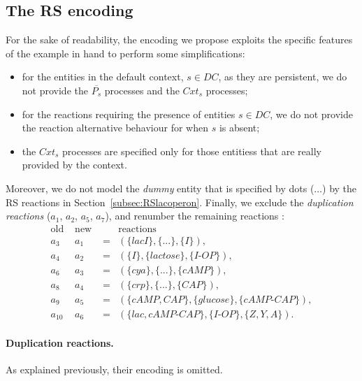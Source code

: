 \subsection{The RS encoding}
For the sake of readability, the encoding we propose exploits the specific features of the example in hand 
to perform some simplifications:
\begin{itemize}
\item for the entities in the default context, $s \in DC$, as they are persistent, we do not provide the $\overline{P_s}$ processes and the $Cxt_s$ processes;
\item for the reactions requiring the presence of entities $s \in DC$, we do not provide the reaction alternative behaviour for when $s$ is absent;
\item the $Cxt_s$ processes are specified only for those entitiess that are really provided by the context.
\end{itemize}
Moreover, we do not model the \emph{dummy} entity that is specified by  dots ($\dots$) by the RS reactions in Section~\ref{subsec:RSlacoperon}.
Finally, we exclude the \emph{duplication reactions} ($a_1$, $a_2$, $a_5$, $a_7$), and renumber the remaining reactions :
{\small
\[
\begin{array}{cccl}
\textrm{old } &\textrm{new }&& \textrm{reactions}\\
a_3 &a_1&=&(\{lacI\},\{. . .\},\{I\}),\\
a_4 &a_2&=&(\{I\},\{lactose\},\{I\textrm{-}OP\}),\\
a_6 & a_3&=&(\{cya\},\{. . .\},\{cAMP\}),\\
a_8 &a_4&=&(\{crp\},\{. . .\},\{CAP\}),\\
a_9 &a_5&=&(\{cAMP, CAP\},\{glucose\},\{cAMP\textrm{-}CAP\}),\\
a_{10} & a_6&=& (\{lac, cAMP\textrm{-}CAP\},\{I\textrm{-}OP\},\{Z, Y, A\}).
\end{array}
\]
}

\paragraph{Duplication reactions.}
As explained previously, their encoding is omitted.
